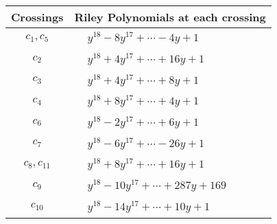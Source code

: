 \documentclass[1p]{elsarticle_modified}
\theoremstyle{definition}
\begin{document}
\begin{tabular}{m{50pt}|m{274pt}}
Crossings & \hspace{64pt}Riley Polynomials at each crossing \\
\hline $$\begin{aligned}c_{1},c_{5}\end{aligned}$$&$\begin{aligned}
&y^{18}-8 y^{17}+\cdots-4 y+1
\end{aligned}$\\
\hline $$\begin{aligned}c_{2}\end{aligned}$$&$\begin{aligned}
&y^{18}+4 y^{17}+\cdots+16 y+1
\end{aligned}$\\
\hline $$\begin{aligned}c_{3}\end{aligned}$$&$\begin{aligned}
&y^{18}+4 y^{17}+\cdots+8 y+1
\end{aligned}$\\
\hline $$\begin{aligned}c_{4}\end{aligned}$$&$\begin{aligned}
&y^{18}+8 y^{17}+\cdots+4 y+1
\end{aligned}$\\
\hline $$\begin{aligned}c_{6}\end{aligned}$$&$\begin{aligned}
&y^{18}-2 y^{17}+\cdots+6 y+1
\end{aligned}$\\
\hline $$\begin{aligned}c_{7}\end{aligned}$$&$\begin{aligned}
&y^{18}-6 y^{17}+\cdots-26 y+1
\end{aligned}$\\
\hline $$\begin{aligned}c_{8},c_{11}\end{aligned}$$&$\begin{aligned}
&y^{18}+8 y^{17}+\cdots+16 y+1
\end{aligned}$\\
\hline $$\begin{aligned}c_{9}\end{aligned}$$&$\begin{aligned}
&y^{18}-10 y^{17}+\cdots+287 y+169
\end{aligned}$\\
\hline $$\begin{aligned}c_{10}\end{aligned}$$&$\begin{aligned}
&y^{18}-14 y^{17}+\cdots+10 y+1
\end{aligned}$\\
\hline
\end{tabular}\\~\\
\end{document}
